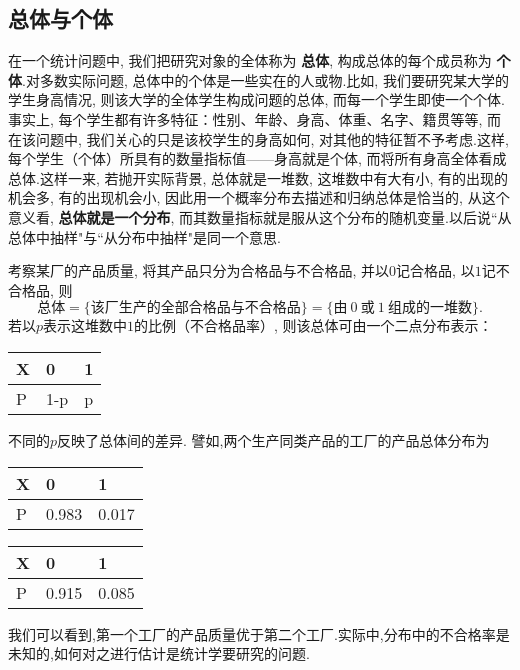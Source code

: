 \subsection{总体与个体\label{ssec:5.1.1}}
在一个统计问题中, 我们把研究对象的全体称为 \textbf{总体}, 构成总体的每个成员称为 \textbf{个体}.对多数实际问题, 总体中的个体是一些实在的人或物.比如, 我们要研究某大学的学生身高情况, 则该大学的全体学生构成问题的总体, 而每一个学生即使一个个体.事实上, 每个学生都有许多特征：性别、年龄、身高、体重、名字、籍贯等等, 而在该问题中, 我们关心的只是该校学生的身高如何, 对其他的特征暂不予考虑.这样, 每个学生（个体）所具有的数量指标值——身高就是个体, 而将所有身高全体看成总体.这样一来, 若抛开实际背景, 总体就是一堆数, 这堆数中有大有小, 有的出现的机会多, 有的出现机会小, 因此用一个概率分布去描述和归纳总体是恰当的, 从这个意义看,  \textbf{总体就是一个分布}, 而其数量指标就是服从这个分布的随机变量.以后说``从总体中抽样"与``从分布中抽样"是同一个意思.
\begin{example}
考察某厂的产品质量, 将其产品只分为合格品与不合格品, 并以$0$记合格品, 以$1$记不合格品, 则
\[\text{总体}=\{\text{该厂生产的全部合格品与不合格品}\}=\{\text{由}~0~\text{或}~1~\text{组成的一堆数}\}.\]
若以$p$表示这堆数中$1$的比例（不合格品率）, 则该总体可由一个二点分布表示：
\begin{center}
\begin{tabularx}{0.4\textwidth}{Y|YY}
  X&0&1\\
  \midrule
  P&1-p&p
  \end{tabularx}
\end{center}
不同的$p$反映了总体间的差异. 譬如,两个生产同类产品的工厂的产品总体分布为

\begin{minipage}{0.4\textwidth}
\centering
\begin{tabularx}{\textwidth}{Y|YY}
X&0&1\\
\midrule
P&0.983&0.017
\end{tabularx}
\end{minipage}\hspace{3\ccwd}
\begin{minipage}{0.4\textwidth}
\centering
\begin{tabularx}{\textwidth}{Y|YY}
X&0&1\\
\midrule
P&0.915&0.085
\end{tabularx}
\end{minipage}

我们可以看到,第一个工厂的产品质量优于第二个工厂.实际中,分布中的不合格率是未知的,如何对之进行估计是统计学要研究的问题.
\end{example}
